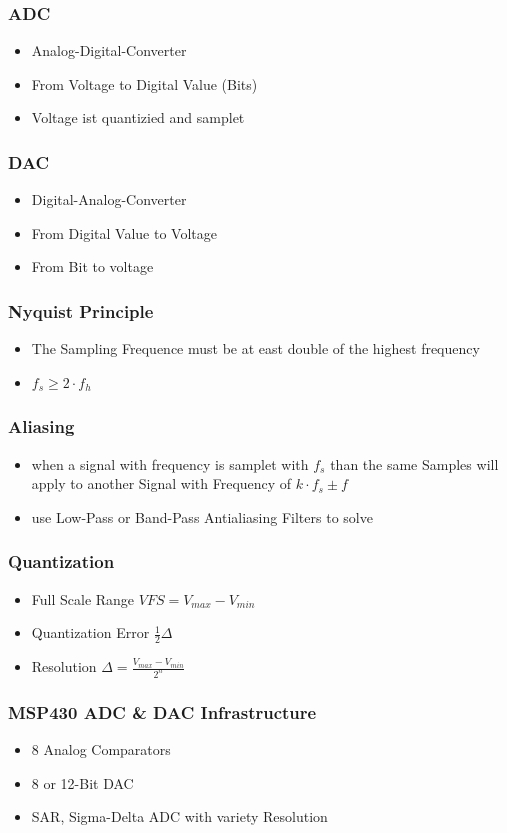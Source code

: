 \begin{multicols}{2}
\subsubsection{ADC}
\begin{itemize}
	\item Analog-Digital-Converter
	\item From Voltage to Digital Value (Bits)
	\item Voltage ist quantizied and samplet
\end{itemize}
\subsubsection{DAC}
\begin{itemize}
	\item Digital-Analog-Converter
	\item From Digital Value to Voltage
	\item From Bit to voltage 
\end{itemize}
\subsubsection{Nyquist Principle}
\begin{itemize}
	\item The Sampling Frequence must  be at east double of the highest frequency
	\item $f_s \ge 2 \cdot f_h$
\end{itemize}
\subsubsection{Aliasing}
\begin{itemize}
	\item when a signal with frequency is samplet with $f_s$ than the same Samples will apply to another Signal with Frequency of $k \cdot f_s \pm f$
	\item use Low-Pass or Band-Pass Antialiasing Filters to solve
\end{itemize}
\subsubsection{Quantization}
\begin{itemize}
	\item Full Scale Range $VFS=V_{max}-V_{min}$
	\item Quantization Error $ \frac{1}{2} \Delta$
	\item Resolution $\Delta = \frac{V_{max}-V_{min}}{2^n}$
\end{itemize}
\subsubsection{MSP430 ADC \& DAC Infrastructure}
\begin{itemize}
	\item 8 Analog Comparators
	\item 8 or 12-Bit DAC
	\item SAR, Sigma-Delta ADC with variety Resolution
	\end{itemize}
\end{multicols}
\pagebreak
\clearpage

